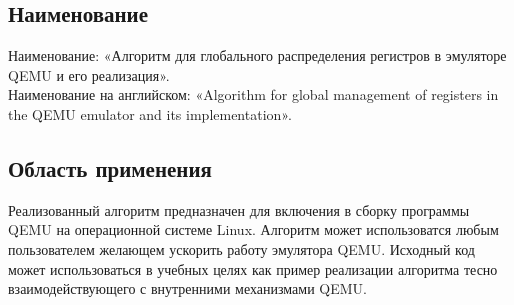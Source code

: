 \subsection{Наименование}
Наименование: «Алгоритм для глобального распределения регистров в эмуляторе QEMU и его реализация». \\
Наименование на английском: «Algorithm for global management of registers in the QEMU emulator and its implementation». \\

\subsection{Область применения}
Реализованный алгоритм предназначен для включения в сборку программы QEMU на операционной системе Linux. Алгоритм может использоватся любым пользователем желающем ускорить работу эмулятора QEMU. Исходный код может использоваться в учебных целях как пример реализации алгоритма тесно взаимодействующего с внутренними механизмами QEMU.
